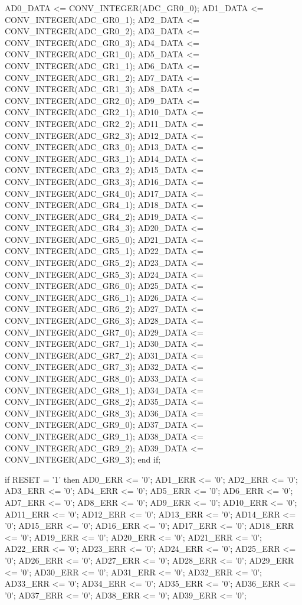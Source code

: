 \begin{mylisting}[language=VHDL,caption=AD変換モジュール,label=appF_ADC_module_VHDL]
				AD0_DATA	<= CONV_INTEGER(ADC_GR0_0);
				AD1_DATA	<= CONV_INTEGER(ADC_GR0_1);
				AD2_DATA	<= CONV_INTEGER(ADC_GR0_2);
				AD3_DATA	<= CONV_INTEGER(ADC_GR0_3);
				AD4_DATA	<= CONV_INTEGER(ADC_GR1_0);
				AD5_DATA	<= CONV_INTEGER(ADC_GR1_1);
				AD6_DATA	<= CONV_INTEGER(ADC_GR1_2);
				AD7_DATA	<= CONV_INTEGER(ADC_GR1_3);
				AD8_DATA	<= CONV_INTEGER(ADC_GR2_0);
				AD9_DATA	<= CONV_INTEGER(ADC_GR2_1);
				AD10_DATA	<= CONV_INTEGER(ADC_GR2_2);
				AD11_DATA	<= CONV_INTEGER(ADC_GR2_3);
				AD12_DATA	<= CONV_INTEGER(ADC_GR3_0);
				AD13_DATA	<= CONV_INTEGER(ADC_GR3_1);
				AD14_DATA	<= CONV_INTEGER(ADC_GR3_2);
				AD15_DATA	<= CONV_INTEGER(ADC_GR3_3);
				AD16_DATA	<= CONV_INTEGER(ADC_GR4_0);
				AD17_DATA	<= CONV_INTEGER(ADC_GR4_1);
				AD18_DATA	<= CONV_INTEGER(ADC_GR4_2);
				AD19_DATA	<= CONV_INTEGER(ADC_GR4_3);
				AD20_DATA	<= CONV_INTEGER(ADC_GR5_0);
				AD21_DATA	<= CONV_INTEGER(ADC_GR5_1);
				AD22_DATA	<= CONV_INTEGER(ADC_GR5_2);
				AD23_DATA	<= CONV_INTEGER(ADC_GR5_3);
				AD24_DATA	<= CONV_INTEGER(ADC_GR6_0);
				AD25_DATA	<= CONV_INTEGER(ADC_GR6_1);
				AD26_DATA	<= CONV_INTEGER(ADC_GR6_2);
				AD27_DATA	<= CONV_INTEGER(ADC_GR6_3);
				AD28_DATA	<= CONV_INTEGER(ADC_GR7_0);
				AD29_DATA	<= CONV_INTEGER(ADC_GR7_1);
				AD30_DATA	<= CONV_INTEGER(ADC_GR7_2);
				AD31_DATA	<= CONV_INTEGER(ADC_GR7_3);
				AD32_DATA	<= CONV_INTEGER(ADC_GR8_0);
				AD33_DATA	<= CONV_INTEGER(ADC_GR8_1);
				AD34_DATA	<= CONV_INTEGER(ADC_GR8_2);
				AD35_DATA	<= CONV_INTEGER(ADC_GR8_3);
				AD36_DATA	<= CONV_INTEGER(ADC_GR9_0);
				AD37_DATA	<= CONV_INTEGER(ADC_GR9_1);
				AD38_DATA	<= CONV_INTEGER(ADC_GR9_2);
				AD39_DATA	<= CONV_INTEGER(ADC_GR9_3);
			end if;

			if RESET = '1' then
				AD0_ERR		<= '0';
				AD1_ERR		<= '0';
				AD2_ERR		<= '0';
				AD3_ERR		<= '0';
				AD4_ERR		<= '0';
				AD5_ERR		<= '0';
				AD6_ERR		<= '0';
				AD7_ERR		<= '0';
				AD8_ERR		<= '0';
				AD9_ERR		<= '0';
				AD10_ERR	<= '0';
				AD11_ERR	<= '0';
				AD12_ERR	<= '0';
				AD13_ERR	<= '0';
				AD14_ERR	<= '0';
				AD15_ERR	<= '0';
				AD16_ERR	<= '0';
				AD17_ERR	<= '0';
				AD18_ERR	<= '0';
				AD19_ERR	<= '0';
				AD20_ERR	<= '0';
				AD21_ERR	<= '0';
				AD22_ERR	<= '0';
				AD23_ERR	<= '0';
				AD24_ERR	<= '0';
				AD25_ERR	<= '0';
				AD26_ERR	<= '0';
				AD27_ERR	<= '0';
				AD28_ERR	<= '0';
				AD29_ERR	<= '0';
				AD30_ERR	<= '0';
				AD31_ERR	<= '0';
				AD32_ERR	<= '0';
				AD33_ERR	<= '0';
				AD34_ERR	<= '0';
				AD35_ERR	<= '0';
				AD36_ERR	<= '0';
				AD37_ERR	<= '0';
				AD38_ERR	<= '0';
				AD39_ERR	<= '0';
			

\end{mylisting}
